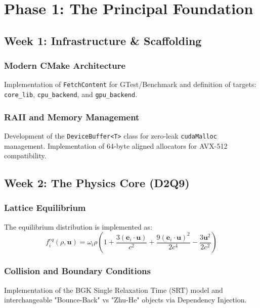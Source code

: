 \chapter{Phase 1: The Principal Foundation}

\section{Week 1: Infrastructure \& Scaffolding}
\subsection{Modern CMake Architecture}
Implementation of \texttt{FetchContent} for GTest/Benchmark and definition of targets: \texttt{core\_lib}, \texttt{cpu\_backend}, and \texttt{gpu\_backend}.

\subsection{RAII and Memory Management}
Development of the \texttt{DeviceBuffer<T>} class for zero-leak \texttt{cudaMalloc} management. Implementation of 64-byte aligned allocators for AVX-512 compatibility.

\section{Week 2: The Physics Core (D2Q9)}
\subsection{Lattice Equilibrium}
The equilibrium distribution is implemented as:
\begin{equation}
f_i^{eq}(\rho, \mathbf{u}) = \omega_i \rho \left( 1 + \frac{3(\mathbf{e}_i \cdot \mathbf{u})}{c^2} + \frac{9(\mathbf{e}_i \cdot \mathbf{u})^2}{2c^4} - \frac{3\mathbf{u}^2}{2c^2} \right)
\end{equation}

\subsection{Collision and Boundary Conditions}
Implementation of the BGK Single Relaxation Time (SRT) model and interchangeable "Bounce-Back" vs "Zhu-He" objects via Dependency Injection.
